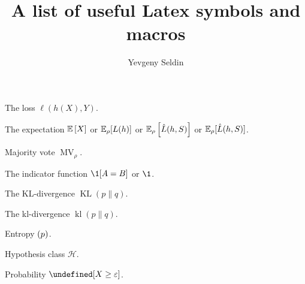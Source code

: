 \documentclass[a4paper]{article}
\title{A list of useful Latex symbols and macros}
\author{Yevgeny Seldin}
\date{}
\newcommand{\lrs}[1]{\left [#1 \right]}
\let\P\undefined
\newcommand{\HH}{\mathcal H}
\DeclareMathOperator{\KL}{KL}
\DeclareMathOperator{\kl}{kl}
\let\H\relax
\DeclareMathOperator{\H}{H}
\DeclareMathOperator{\MV}{MV}
\begin{document}
\maketitle

The loss $\ell(h(X), Y)$.

The expectation $\E[X]$ or $\E_\rho[L(h)]$ or $\E_\rho\lrs{\hat L(h,S)}$ or $\E_\rho[\hat L(h,S)]$.

Majority vote $\MV_\rho$.

The indicator function $\1[A = B]$ or $\1$.

The KL-divergence $\KL(p\|q)$.

The kl-divergence $\kl(p\|q)$.

Entropy $\H(p)$.

Hypothesis class $\HH$.

Probability $\P[X \geq \varepsilon]$.
\end{document}
